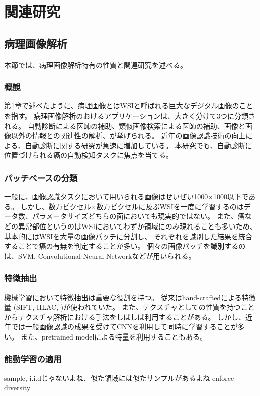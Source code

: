 \chapter{関連研究}

\section{病理画像解析}
本節では、病理画像解析特有の性質と関連研究を述べる。

\subsection{概観}
第1章で述べたように、病理画像とはWSIと呼ばれる巨大なデジタル画像のことを指す。
病理画像解析のおけるアプリケーションは、大きく分けて3つに分類される\cite{komuraishikawa}。
自動診断による医師の補助、類似画像検索による医師の補助、画像と画像以外の情報との関連性の解析、が挙げられる。
近年の画像認識技術の向上による、自動診断に関する研究が急速に増加している。
本研究でも、自動診断に位置づけられる癌の自動検知タスクに焦点を当てる。

\subsection{パッチベースの分類}
一般に、画像認識タスクにおいて用いられる画像はせいぜい1000×1000以下である。
しかし、数万ピクセル×数万ピクセルに及ぶWSIを一度に学習するのはデータ数、パラメータサイズどちらの面においても現実的ではない。
また、癌などの異常部位というのはWSIにおいてわずか領域にのみ現れることも多いため、基本的にはWSIを大量の画像パッチに分割し、
それぞれを識別した結果を統合することで癌の有無を判定することが多い。
個々の画像パッチを識別するのは、SVM, Convolutional Neural Networkなどが用いられる。

\subsection{特徴抽出}

機械学習において特徴抽出は重要な役割を持つ。
従来はhand-craftedによる特徴量 (SIFT, HLAC,  )が使われていた。
また、テクスチャとしての性質を持つことからテクスチャ解析における手法をしばしば利用することがある。
しかし、近年では一般画像認識の成果を受けてCNNを利用して同時に学習することが多い。
また、pretrained modelによる特量を利用することもある。

\subsection{能動学習の適用}
sample, i.i.dじゃないよね．似た領域には似たサンプルがあるよね
enforce diversity 

